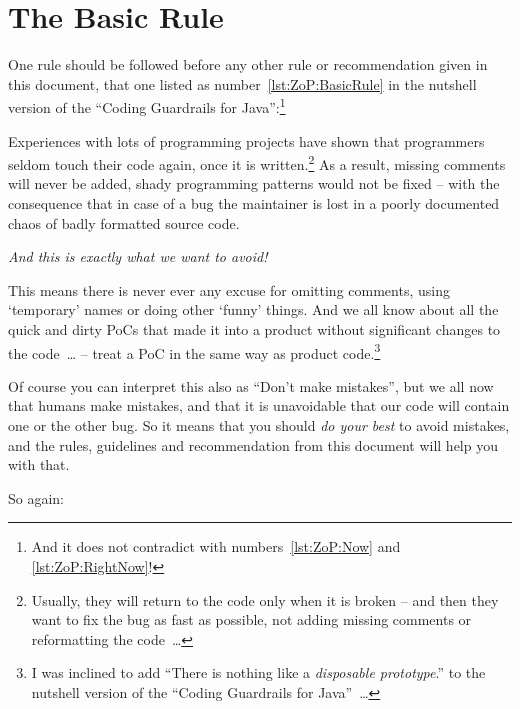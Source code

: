 \documentclass[11pt,a4paper, titlepage, parskip=half, headsepline, footsepline, cleardoublepage=current, headheight=1cm]{scrbook}
\begin{document}
\section{The Basic Rule}\label{sec:TheBasicRule}
One rule should be followed before any other rule or recommendation given in this document, that one listed as number~\ref{lst:ZoP:BasicRule} in the nutshell version of the “Coding Guardrails for Java”:\footnote{And it does not contradict with numbers~\ref{lst:ZoP:Now} and \ref{lst:ZoP:RightNow}!}

\begin{center}
	\begin{huge}
	\end{huge}
\end{center}

Experiences with lots of programming projects have shown that programmers seldom touch their code again, once it is written.\footnote{Usually, they will return to the code only when it is broken – and then they want to fix the bug as fast as possible, not adding missing comments or reformatting the code~…} As a result, missing comments will never be added, shady programming patterns would not be fixed – with the consequence that in case of a bug the maintainer is lost in a poorly documented chaos of badly formatted source code.

\textit{And this is exactly what we want to avoid!} 

This means there is never ever any excuse for omitting comments, using ‘temporary’ names or doing other ‘funny’ things. And we all know about all the quick and dirty PoCs that made it into a product without significant changes to the code~… – treat a PoC in the same way as product code.\footnote{I was inclined to add “There is nothing like a \textit{disposable prototype}.” to the nutshell version of the “Coding Guardrails for Java”~…}

Of course you can interpret this also as “Don't make mistakes”, but we all now that humans make mistakes, and that it is unavoidable that our code will contain one or the other bug. So it means that you should \textit{do your best} to avoid mistakes, and the rules, guidelines and recommendation from this document will help you with that.

So again:

\begin{center}
	\begin{huge}
		\fbox{\textbf{Always do it right in the first place!}}
	\end{huge}
\end{center}
\end{document}
